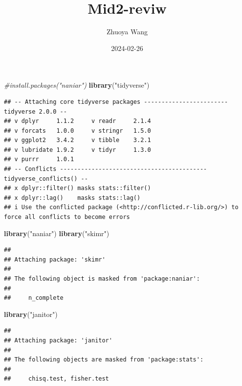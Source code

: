 \documentclass[
]{article}
\title{Mid2-reviw}
\author{Zhuoya Wang}
\date{2024-02-26}
\newenvironment{Shaded}{\begin{snugshade}}{\end{snugshade}}
\newcommand{\CommentTok}[1]{\textcolor[rgb]{0.56,0.35,0.01}{\textit{#1}}}
\newcommand{\FunctionTok}[1]{\textcolor[rgb]{0.13,0.29,0.53}{\textbf{#1}}}
\newcommand{\NormalTok}[1]{#1}
\newcommand{\StringTok}[1]{\textcolor[rgb]{0.31,0.60,0.02}{#1}}
\begin{document}
\maketitle

\begin{Shaded}
\begin{Highlighting}[]
\CommentTok{\#install.packages("naniar")}
\FunctionTok{library}\NormalTok{(}\StringTok{"tidyverse"}\NormalTok{)}
\end{Highlighting}
\end{Shaded}

\begin{verbatim}
## -- Attaching core tidyverse packages ------------------------ tidyverse 2.0.0 --
## v dplyr     1.1.2     v readr     2.1.4
## v forcats   1.0.0     v stringr   1.5.0
## v ggplot2   3.4.2     v tibble    3.2.1
## v lubridate 1.9.2     v tidyr     1.3.0
## v purrr     1.0.1     
## -- Conflicts ------------------------------------------ tidyverse_conflicts() --
## x dplyr::filter() masks stats::filter()
## x dplyr::lag()    masks stats::lag()
## i Use the conflicted package (<http://conflicted.r-lib.org/>) to force all conflicts to become errors
\end{verbatim}

\begin{Shaded}
\begin{Highlighting}[]
\FunctionTok{library}\NormalTok{(}\StringTok{"naniar"}\NormalTok{)}
\FunctionTok{library}\NormalTok{(}\StringTok{"skimr"}\NormalTok{)}
\end{Highlighting}
\end{Shaded}

\begin{verbatim}
## 
## Attaching package: 'skimr'
## 
## The following object is masked from 'package:naniar':
## 
##     n_complete
\end{verbatim}

\begin{Shaded}
\begin{Highlighting}[]
\FunctionTok{library}\NormalTok{(}\StringTok{"janitor"}\NormalTok{)}
\end{Highlighting}
\end{Shaded}

\begin{verbatim}
## 
## Attaching package: 'janitor'
## 
## The following objects are masked from 'package:stats':
## 
##     chisq.test, fisher.test
\end{verbatim}
\end{document}
